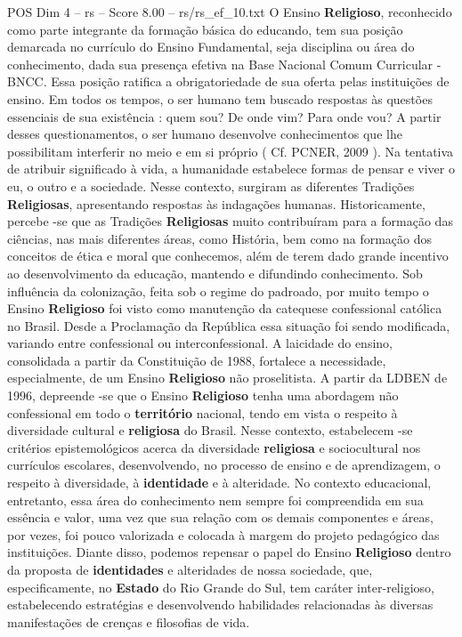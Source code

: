 \begin{textsample}{POS Dim 4 – rs – Score 8.00 – rs/rs\_ef\_10.txt}  \label{ex:f4_pos_097}
O Ensino \textbf{Religioso}, reconhecido como parte integrante da formação básica do educando, tem sua posição demarcada no currículo do Ensino Fundamental, seja disciplina ou área do conhecimento, dada sua presença efetiva na Base Nacional Comum Curricular - BNCC.
Essa posição ratifica a obrigatoriedade de sua oferta pelas instituições de ensino.
Em todos os tempos, o ser humano tem buscado respostas às questões essenciais de sua existência : quem sou?
De onde vim?
Para onde vou?
A partir desses questionamentos, o ser humano desenvolve conhecimentos que lhe possibilitam interferir no meio e em si próprio ( Cf.
PCNER, 2009 ).
Na tentativa de atribuir significado à vida, a humanidade estabelece formas de pensar e viver o eu, o outro e a sociedade.
Nesse contexto, surgiram as diferentes Tradições \textbf{Religiosas}, apresentando respostas às indagações humanas.
Historicamente, percebe -se que as Tradições \textbf{Religiosas} muito contribuíram para a formação das ciências, nas mais diferentes áreas, como História, bem como na formação dos conceitos de ética e moral que conhecemos, além de terem dado grande incentivo ao desenvolvimento da educação, mantendo e difundindo conhecimento.
Sob influência da colonização, feita sob o regime do padroado, por muito tempo o Ensino \textbf{Religioso} foi visto como manutenção da catequese confessional católica no Brasil.
Desde a Proclamação da República essa situação foi sendo modificada, variando entre confessional ou interconfessional.
A laicidade do ensino, consolidada a partir da Constituição de 1988, fortalece a necessidade, especialmente, de um Ensino \textbf{Religioso} não proselitista.
A partir da LDBEN de 1996, depreende -se que o Ensino \textbf{Religioso} tenha uma abordagem não confessional em todo o \textbf{território} nacional, tendo em vista o respeito à diversidade cultural e \textbf{religiosa} do Brasil.
Nesse contexto, estabelecem -se critérios epistemológicos acerca da diversidade \textbf{religiosa} e sociocultural nos currículos escolares, desenvolvendo, no processo de ensino e de aprendizagem, o respeito à diversidade, à \textbf{identidade} e à alteridade.
No contexto educacional, entretanto, essa área do conhecimento nem sempre foi compreendida em sua essência e valor, uma vez que sua relação com os demais componentes e áreas, por vezes, foi pouco valorizada e colocada à margem do projeto pedagógico das instituições.
Diante disso, podemos repensar o papel do Ensino \textbf{Religioso} dentro da proposta de \textbf{identidades} e alteridades de nossa sociedade, que, especificamente, no \textbf{Estado} do Rio Grande do Sul, tem caráter inter-religioso, estabelecendo estratégias e desenvolvendo habilidades relacionadas às diversas manifestações de crenças e filosofias de vida.

\end{textsample}
